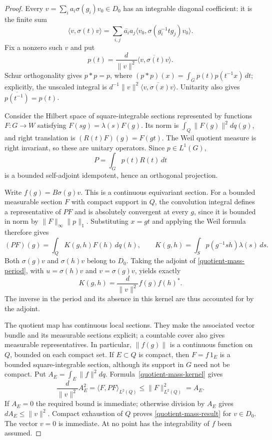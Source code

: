 \begin{proof}
Every $v=\sum_i a_i\sigma(g_i)v_0\in D_0$ has an integrable
diagonal coefficient: it is the finite sum
\[
 \langle v,\sigma(t)v\rangle
 =\sum_{i,j}\overline{a_i}a_j
       \langle v_0,\sigma(g_i^{-1}tg_j)v_0\rangle.
\]
Fix a nonzero such $v$ and put
\[
       p(t)=\frac d{\|v\|^2}
                    \overline{\langle v,\sigma(t)v\rangle}.
\]
Schur orthogonality gives $p*p=p$, where
$(p*p)(x)=\int_Gp(t)p(t^{-1}x)\,dt$; explicitly, the unscaled
integral is
$d^{-1}\|v\|^2\overline{\langle v,\sigma(x)v\rangle}$.
Unitarity also gives $\overline{p(t^{-1})}=p(t)$.

Consider the Hilbert space of square-integrable sections represented
by functions $F:G\to W$ satisfying $F(sg)=\lambda(s)F(g)$.
Its norm is $\int_Q\|F(g)\|^2dq(g)$, and right translation is
$(R(t)F)(g)=F(gt)$.  The Weil quotient measure is right invariant,
so these are unitary operators.  Since $p\in L^1(G)$,
\[
                      P=\int_Gp(t)R(t)\,dt
\]
is a bounded self-adjoint idempotent, hence an orthogonal projection.

Write $f(g)=B\sigma(g)v$.  This is a continuous equivariant section.
For a bounded measurable section $F$ with compact support in $Q$,
the convolution integral defines a representative of $PF$ and is
absolutely convergent at every $g$, since it is bounded in norm by
$\|F\|_\infty\|p\|_1$.  Substituting $x=gt$
and applying the Weil formula therefore gives
\[
 (PF)(g)=\int_QK(g,h)F(h)\,dq(h),\qquad
 K(g,h)=\int_Sp(g^{-1}sh)\lambda(s)\,ds.
\]
Both $\sigma(g)v$ and $\sigma(h)v$ belong to $D_0$.
Taking the adjoint of \eqref{quotient-mass-period}, with
$u=\sigma(h)v$ and $v=\sigma(g)v$, yields exactly
\begin{equation}\label{quotient-mass-kernel}
                    K(g,h)=\frac d{\|v\|^2}f(g)f(h)^*.
\end{equation}
The inverse in the period and its absence in this kernel are thus
accounted for by the adjoint.

The quotient map has continuous local sections.  They make the
associated vector bundle and its measurable sections explicit;
a countable cover also gives measurable representatives.  In
particular, $\|f(g)\|$ is a continuous function on $Q$, bounded on
each compact set.  If $E\subset Q$ is compact, then
$F=f\,1_E$ is a bounded square-integrable section, although its
support in $G$ need not be compact.  Put
$A_E=\int_E\|f\|^2dq$.  Formula~\eqref{quotient-mass-kernel} gives
\[
       \frac d{\|v\|^2}A_E^2
           =\langle F,PF\rangle_{L^2(Q)}
           \le\|F\|_{L^2(Q)}^2=A_E.
\]
If $A_E=0$ the required bound is immediate; otherwise division by
$A_E$ gives $d A_E\le\|v\|^2$.  Compact exhaustion of $Q$ proves
\eqref{quotient-mass-result} for $v\in D_0$.  The vector $v=0$
is immediate.  At no point has the integrability of $f$ been assumed.


\end{proof}
